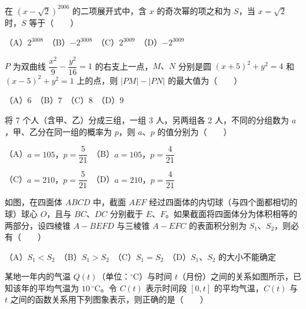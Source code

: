 \begin{question}
在 $(x-\sqrt2)^{2006}$ 的二项展开式中，含 $x$ 的奇次幂的项之和为 $S$，当 $x=\sqrt2$ 时，$S$ 等于\mbox{（　　）}

（A）$2^{3008}$　（B）$-2^{3008}$　（C）$2^{3009}$　（D）$-2^{3009}$

\end{question}
\begin{question}
$P$ 为双曲线 $\dfrac{x^2}{9}-\dfrac{y^2}{16}=1$ 的右支上一点，$M\text{、}N$ 分别是圆 $(x+5)^2+y^2=4$ 和 $(x-5)^2+y^2=1$ 上的点，则 $|PM|-|PN|$ 的最大值为\mbox{（　　）}

（A）$6$　（B）$7$　（C）$8$　（D）$9$

\end{question}
\begin{question}
将 7 个人（含甲、乙）分成三组，一组 3 人，另两组各 2 人，不同的分组数为 $a$，甲、乙分在同一组的概率为 $p$，则 $a\text{、}p$ 的值分别为\mbox{（　　）}

（A）$a=105\text{，}p=\dfrac5{21}$　（B）$a=105\text{，}p=\dfrac4{21}$

（C）$a=210\text{，}p=\dfrac5{21}$　（D）$a=210\text{，}p=\dfrac4{21}$

\Needspace{0.4\textheight}
\end{question}
\begin{question}
如图，在四面体 $ABCD$ 中，截面 $AEF$ 经过四面体的内切球（与四个面都相切的球）球心 $O$，且与 $BC\text{、}DC$ 分别截于 $E\text{、}F$。如果截面将四面体分为体积相等的两部分，设四棱锥 $A-BEFD$ 与三棱锥 $A-EFC$ 的表面积分别为 $S_1\text{、}S_2$，则必有\mbox{（　　）}

（A）$S_1<S_2$　（B）$S_1>S_2$　（C）$S_1=S_2$　（D）$S_1\text{、}S_2$ 的大小不能确定
\nopagebreak[4]
\begin{center}\end{center}
\nopagebreak[4]
\Needspace{0.4\textheight}
\end{question}
\begin{question}
某地一年内的气温 $Q(t)$（单位：$^\circ\mathrm C$）与时间 $t$（月份）之间的关系如图所示，已知该年的平均气温为 $10\ ^\circ\mathrm C$。令 $C(t)$ 表示时间段 $[0,t]$ 的平均气温，$C(t)$ 与 $t$ 之间的函数关系用下列图象表示，则正确的是\mbox{（　　）}
\nopagebreak[4]
\begin{center}\end{center}
\nopagebreak[4]
\end{question}

